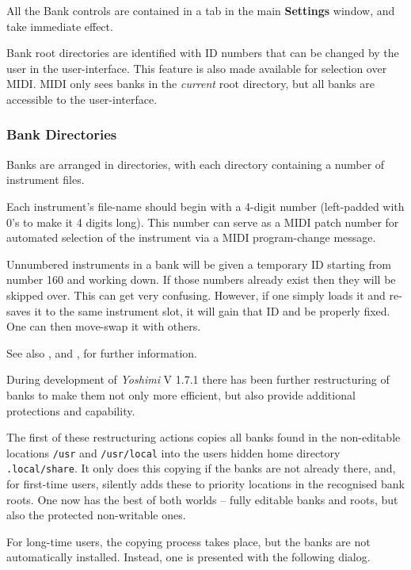    All the Bank controls are contained in a tab in the main
   \textbf{Settings} window, and take immediate effect.

   Bank root directories are identified with ID numbers that can be changed
   by the user in the user-interface. This feature is also made available for
   selection over MIDI.  MIDI only sees banks in the \textsl{current} root
   directory, but all banks are accessible to the user-interface.

\subsubsection{Bank Directories}
\label{subsubsec:banks_and_roots_bank_directories}

   Banks are arranged in directories, with each directory containing a number
   of instrument files.

   Each instrument's file-name should begin with a 4-digit number
   (left-padded with 0's to make it 4 digits long).  This number can serve
   as a MIDI patch number for automated selection of the instrument via a
   MIDI program-change message.

   Unnumbered instruments in a bank will be given a temporary ID starting
   from number 160 and working down. If those numbers already exist then
   they will be skipped over. This can get very confusing. However, if one
   simply loads it and re-saves it to the same instrument slot, it will gain
   that ID and be properly fixed.  One can then move-swap it with others.

   See also , and
   , for further information.

   During development of \textsl{Yoshimi} V 1.7.1 there has been further
   restructuring of banks to make them not only more efficient, but also provide
   additional protections and capability.

   The first of these restructuring actions copies all banks found in the
   non-editable locations \texttt{/usr} and \texttt{/usr/local} into the users
   hidden home directory \texttt{.local/share}. It only does this copying if the
   banks are not already there, and, for first-time users, silently adds these to
   priority locations in the recognised bank roots. One now has the best of both
   worlds -- fully editable banks and roots, but also the protected non-writable
   ones.

   For long-time users, the copying process takes place, but the banks are not
   automatically installed. Instead, one is presented with the following dialog.

